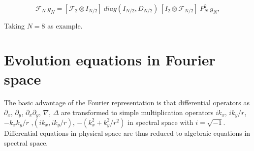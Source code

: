 \begin{equation} \label{eq_FNFNr2_02} 
 \mathcal{F}_{N} \ g_{N} 
   = 
 \left[ \mathcal{F}_{2} \otimes I_{N/2} \right] \ 
 diag(I_{N/2},D_{N/2})  \ 
 \left[ I_{2} \otimes \mathcal{F}_{N/2} \right] \
 P_{N}^{2} \ g_{N},
\end{equation}

Taking $N=8$ as example.



\section{Evolution equations in Fourier space}
\label{ssec_evolfourier}
The basic advantage of the Fourier representation is that
differential operators as $\partial_{x}$,
$\partial_{y}$, $\partial_{x} \partial_{y}$, $\nabla$, $\Delta$
are transformed to simple multiplication operators
$i k_{x}$, $i k_{y}/r$, $- k_{x} k_{y}/r$ ,$(i k_{x},i k_{y}/r)$, 
$-(k_{x}^{2} + k_{y}^{2}/r^{2})$ in spectral space with $i = \sqrt{-1}$.
Differential equations in physical space are thus reduced to algebraic 
equations in spectral space.

